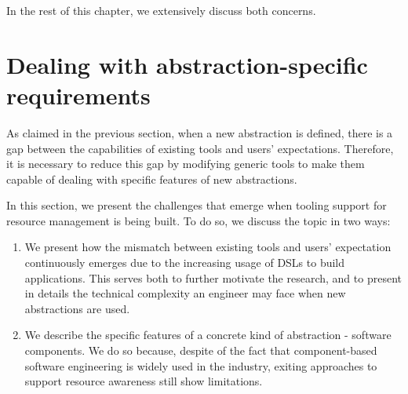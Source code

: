 In the rest of this chapter, we extensively discuss both concerns.

\section{Dealing with abstraction-specific requirements} \label{sec:abstraction-specific-requirements}
As claimed in the previous section, when a new abstraction is defined, there is a gap between the capabilities of existing tools and users' expectations.
Therefore, it is necessary to reduce this gap by modifying generic tools to make them capable of dealing with specific features of new abstractions.

In this section, we present the challenges that emerge when tooling support for resource management is being built.
To do so, we discuss the topic in two ways:

\begin{enumerate}
\item  We present how the mismatch between existing tools and users' expectation continuously emerges due to the increasing usage of DSLs to build applications.
This serves both to further motivate the research, and to present in details the technical complexity an engineer may face when new abstractions are used.

\item We describe the specific features of a concrete kind of abstraction - software components.
We do so because, despite of the fact that component-based software engineering is widely used in the industry, exiting approaches to support resource awareness still show limitations.
\end{enumerate}

